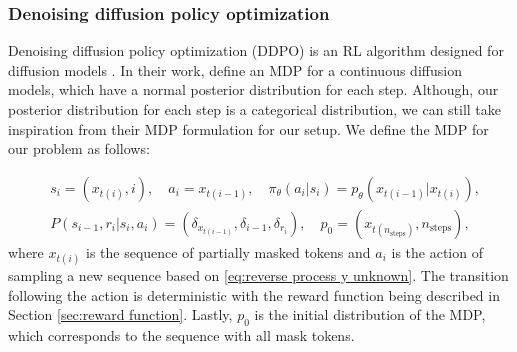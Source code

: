 


\subsubsection{Denoising diffusion policy optimization}
\label{sec:DDPO}

Denoising diffusion policy optimization (DDPO) is an RL algorithm designed for diffusion models \cite{black2024trainingdiffusionmodelsreinforcement}. In their work, \citeauthor{black2024trainingdiffusionmodelsreinforcement} \cite{black2024trainingdiffusionmodelsreinforcement} define an MDP for a continuous diffusion models, which have a normal posterior distribution for each step. Although, our posterior distribution for each step is a categorical distribution, we can still take inspiration from their MDP formulation for our setup. We define the MDP for our problem as follows:

\begin{align*}
     & s_i = (x_{t(i)}, i), \quad a_i = x_{t(i - 1)}, \quad \pi_\theta(a_i | s_i) = p_\theta(x_{t(i - 1)} | x_{t(i)}),                                \\
     & P(s_{i - 1}, r_i | s_i, a_i) = (\delta_{x_{t(i - 1)}}, \delta_{i - 1}, \delta_{r_i}), \quad p_0 = (x_{t(n_\mathrm{steps})}, n_\mathrm{steps}),
\end{align*}
where $x_{t(i)}$ is the sequence of partially masked tokens and $a_i$ is the action of sampling a new sequence based on \eqref{eq:reverse process y unknown}. The transition following the action is deterministic with the reward function being described in Section \ref{sec:reward function}. Lastly, $p_0$ is the initial distribution of the MDP, which corresponds to the sequence with all mask tokens.

